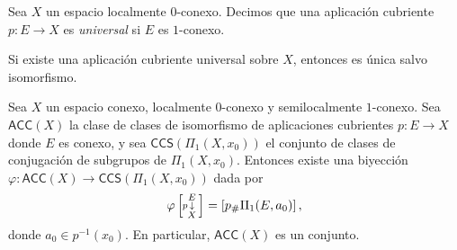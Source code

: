 \begin{definicion}
Sea $X$ un espacio localmente $0$-conexo. Decimos que una aplicación cubriente $p \colon E \to X$ es \textit{universal} si $E$ es $1$-conexo.
\end{definicion}

\begin{ejercicio}
Si existe una aplicación cubriente universal sobre $X$, entonces es única salvo isomorfismo.
\end{ejercicio}

\begin{teorema}
Sea $X$ un espacio conexo, localmente $0$-conexo y semilocalmente $1$-conexo. Sea $\textsf{ACC}(X)$ la clase de clases de isomorfismo de aplicaciones cubrientes $p \colon E \to X$ donde $E$ es conexo, y sea $\textsf{CCS}(\Pi_1(X, x_0))$ el conjunto de clases de conjugación de subgrupos de $\Pi_1(X, x_0)$. Entonces existe una biyección $\varphi \colon \textsf{ACC}(X) \to \textsf{CCS}(\Pi_1(X, x_0))$ dada por 
$$\varphi\left[\hspace{0.65mm}\begin{smallmatrix} E \\ \mathllap{\scriptstyle p\,}\downarrow \\ X \end{smallmatrix}\right] = \left[p_{\#}\Pi_1(E, a_0)\right],$$ donde $a_0 \in p^{-1}(x_0)$. En particular, $\textsf{ACC}(X)$ es un conjunto.
\end{teorema}

